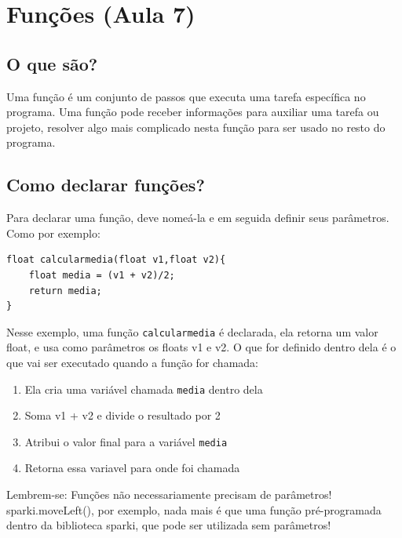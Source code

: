 \documentclass[conference]{IEEEtran}
\begin{document}
\vspace{0.5cm}
\section{Funções (Aula 7)}


\subsection{O que são?}
Uma função é um conjunto de passos que executa uma tarefa específica
no programa. Uma função pode receber informações para auxiliar uma
tarefa ou projeto, resolver algo mais complicado nesta função para ser
usado no resto do programa.

\vspace{0.2cm}

\subsection{Como declarar funções?}
Para declarar uma função, deve nomeá-la e em seguida definir seus
parâmetros. Como por exemplo:

\begin{lstlisting}[caption={Declarando uma função}]
float calcularmedia(float v1,float v2){
    float media = (v1 + v2)/2;
    return media;
}
\end{lstlisting}

\vspace{0.2cm}

Nesse exemplo, uma função \texttt{calcularmedia} é declarada, ela retorna um valor float, e usa como parâmetros os floats v1 e v2. 
O que for definido dentro dela é o que vai ser executado quando a função for chamada:
\begin{enumerate}
    \item Ela cria uma variável chamada \texttt{media} dentro dela
    \item Soma v1 + v2 e divide o resultado por 2
    \item Atribui o valor final para a variável \texttt{media}
    \item Retorna essa variavel para onde foi chamada
\end{enumerate}

\vspace{0.2cm}
Lembrem-se: Funções não necessariamente precisam de parâmetros! sparki.moveLeft(), por exemplo, nada mais é que uma função pré-programada dentro da biblioteca sparki, que pode ser utilizada sem parâmetros!
\vspace{0.2cm}
\end{document}
